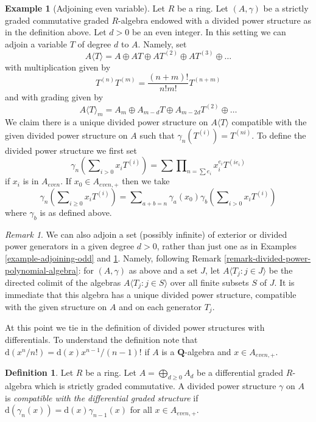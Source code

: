\documentclass{stacks-project}
\theoremstyle{plain}
\theoremstyle{definition}
\newtheorem{definition}[subsection]{Definition}
\newtheorem{example}[subsection]{Example}
\theoremstyle{remark}
\newtheorem{remark}[subsection]{Remark}
\numberwithin{equation}{subsection}
\begin{document}
\begin{example}[Adjoining even variable]
\label{example-adjoining-even}
Let $R$ be a ring. Let $(A, \gamma)$ be a strictly graded commutative
graded $R$-algebra endowed with a divided power structure as in the
definition above. Let $d > 0$ be an even integer.
In this setting we can adjoin a variable $T$ of degree $d$ to $A$.
Namely, set
$$
A\langle T \rangle = A \oplus AT \oplus AT^{(2)} \oplus AT^{(3)} \oplus \ldots
$$
with multiplication given by
$$
T^{(n)} T^{(m)} = \frac{(n + m)!}{n!m!} T^{(n + m)}
$$
and with grading given by
$$
A\langle T \rangle_m =
A_m \oplus A_{m - d}T \oplus A_{m - 2d}T^{(2)} \oplus \ldots
$$
We claim there is a unique divided power structure on
$A\langle T \rangle$ compatible with the given divided power
structure on $A$ such that $\gamma_n(T^{(i)}) = T^{(ni)}$.
To define the divided power structure we first set
$$
\gamma_n\left(\sum\nolimits_{i > 0} x_i T^{(i)}\right) =
\sum \prod\nolimits_{n = \sum e_i} x_i^{e_i} T^{(ie_i)}
$$
if $x_i$ is in $A_{even}$. If $x_0 \in A_{even, +}$
then we take
$$
\gamma_n\left(\sum\nolimits_{i \geq 0} x_i T^{(i)}\right) =
\sum\nolimits_{a + b = n}
\gamma_a(x_0)\gamma_b\left(\sum\nolimits_{i > 0} x_iT^{(i)}\right)
$$
where $\gamma_b$ is as defined above.
\end{example}

\begin{remark}
\label{remark-adjoining-set-of-variables}
We can also adjoin a set (possibly infinite) of exterior or divided
power generators in a given degree $d > 0$, rather than just one
as in Examples \ref{example-adjoining-odd}
and \ref{example-adjoining-even}. Namely, 
following Remark \ref{remark-divided-power-polynomial-algebra}:
for $(A,\gamma)$
as above and a set $J$, let $A\langle
T_j:j\in J\rangle$ be the directed colimit of the algebras
$A\langle T_j:j\in S\rangle$ over all finite subsets $S$
of $J$. It is immediate that this algebra has a unique divided power
structure, compatible with the given structure on $A$ and on
each generator $T_j$.
\end{remark}

\noindent
At this point we tie in the definition of divided power structures
with differentials. To understand the definition note that
$\text{d}(x^n/n!) = \text{d}(x) x^{n - 1}/(n - 1)!$ if $A$
is a $\mathbf{Q}$-algebra and $x \in A_{even, +}$.

\begin{definition}
\label{definition-divided-powers-dga}
Let $R$ be a ring. Let $A = \bigoplus_{d \geq 0} A_d$ be a
differential graded $R$-algebra which is strictly graded commutative.
A divided power structure $\gamma$ on $A$ is {\it compatible with
the differential graded structure} if
$\text{d}(\gamma_n(x)) = \text{d}(x) \gamma_{n - 1}(x)$ for
all $x \in A_{even, +}$.
\end{definition}
\end{document}
